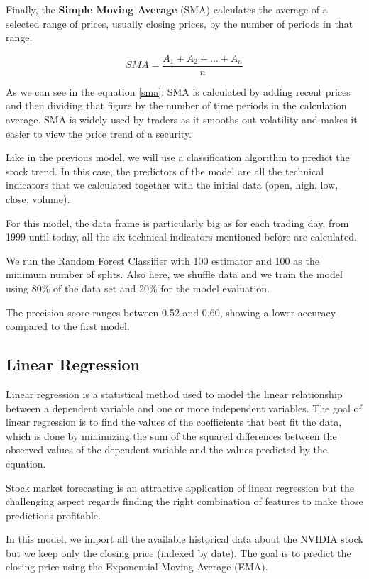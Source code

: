 \documentclass[conference,compsoc]{IEEEtran}
\begin{document}
Finally, the \textbf{Simple Moving Average} (SMA) calculates the average of a selected range of prices, usually closing prices, by the number of periods in that range.

\begin{equation} \label{sma}
    SMA =   \frac{A_{1} +  A_{2} + ... +  A_{n}}{n}
\end{equation}

As we can see in the equation \ref{sma}, SMA is calculated by adding recent prices and then dividing that figure by the number of time periods in the calculation average.
%
SMA is widely used by traders as it smooths out volatility and makes it easier to view the price trend of a security.

Like in the previous model, we will use a classification algorithm to predict the stock trend.
%
In this case, the predictors of the model are all the technical indicators that we calculated together with the initial data (open, high, low, close, volume).

For this model, the data frame is particularly big as for each trading day, from 1999 until today, all the six technical indicators mentioned before are calculated.

We run the Random Forest Classifier with 100 estimator and 100 as the minimum number of splits.
%
Also here, we shuffle data and we train the model using 80\% of the data set and 20\% for the model evaluation.

The precision score ranges between 0.52 and 0.60, showing a lower accuracy compared to the first model.

\subsection*{Linear Regression}
Linear regression is a statistical method used to model the linear relationship between a dependent variable and one or more independent variables.
%
The goal of linear regression is to find the values of the coefficients that best fit the data, which is done by minimizing the sum of the squared differences between the observed values of the dependent variable and the values predicted by the equation.

Stock market forecasting is an attractive application of linear regression but the challenging aspect regards finding the right combination of features to make those predictions profitable.

In this model, we import all the available historical data about the NVIDIA stock but we keep only the closing price (indexed by date).
%
The goal is to predict the closing price using the Exponential Moving Average (EMA).
\end{document}
